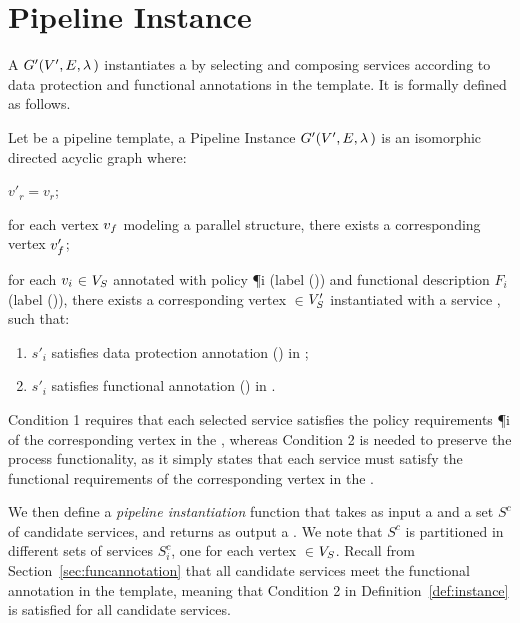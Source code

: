 \section{Pipeline Instance}\label{sec:instance}
A \pipelineInstance $G'(V',E,\lambda\,)$ instantiates a \pipelineTemplate \tChartFunction by selecting and composing services according to data protection and functional annotations in the template. It is formally defined as follows.
\vspace{0.5em}
\begin{definition}\label{def:instance}
  Let \tChartFunction be a pipeline template, a Pipeline Instance $G'(V',E,\lambda\,)$ is an isomorphic directed acyclic graph where:
  \begin{enumerate*}[label=\textit{\roman*})]
    \item $v'_r$$=$$v_r$;
    \item for each vertex $v_{f}$ modeling a parallel structure, there exists a corresponding vertex $v'_{f}$;
    \item for each $v_{i}$$\in$$V_S$ annotated with policy \P{i} (label \myLambda()) and functional description $F_i$ (label \myGamma()), there exists a corresponding vertex $\in$$V'_S$ instantiated with a service , such that:
  \end{enumerate*}
  \begin{enumerate}[label=\arabic*)]
    \item $s'_i$ satisfies data protection annotation \myLambda() in \tChartFunction;
    \item $s'_i$ satisfies functional annotation \myGamma() in \tChartFunction.
  \end{enumerate}
\end{definition}

\vspace{0.5em}

Condition 1 requires that each selected service  satisfies the policy requirements \P{i} of the corresponding vertex  in the \pipelineTemplate, whereas Condition 2 is needed to preserve the process functionality, as it simply states that each service  must satisfy the functional requirements  of the corresponding vertex  in the \pipelineTemplate.

We then define a \emph{pipeline instantiation} function that takes as input a \pipelineTemplate \tChartFunction and a set $S^c$ of candidate services, and returns as output a \pipelineInstance \iChartFunction. We note that $S^c$ is partitioned in different sets of services $S^c_{i}$, one for each vertex $\in$$V_S$. Recall from Section~\ref{sec:funcannotation} that all candidate services meet the functional annotation in the template, meaning that Condition 2 in Definition~\ref{def:instance} is satisfied for all candidate services.

